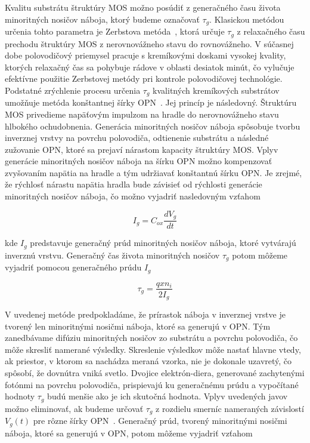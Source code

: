 Kvalitu substrátu štruktúry MOS možno posúdiť z generačného času
života minoritných nosičov náboja, ktorý budeme označovať
$\tau_g$. Klasickou metódou určenia tohto parametra je Zerbstova
metóda~\cite{3.2}, ktorá určuje $\tau_g$ z relaxačného času prechodu
štruktúry MOS z nerovnovážneho stavu do rovnovážneho. V súčasnej dobe
polovodičový priemysel pracuje s kremíkovými doskami vysokej kvality,
ktorých relaxačný čas sa pohybuje rádove v oblasti desiatok minút, čo
vylučuje efektívne použitie Zerbstovej metódy pri kontrole
polovodičovej technológie. Podstatné zrýchlenie procesu určenia
$\tau_g$ kvalitných kremíkových substrátov umožňuje metóda konštantnej
šírky OPN~\cite{3.1}. Jej princíp je následovný.  Štruktúru MOS
privedieme napäťovým impulzom na hradle do nerovnovážneho stavu
hlbokého ochudobnenia. Generácia minoritných nosičov náboja spôsobuje
tvorbu inverznej vrstvy na povrchu polovodiča, odtienenie substrátu a
následné zužovanie OPN, ktoré sa prejaví nárastom kapacity štruktúry
MOS\@. Vplyv generácie minoritných nosičov náboja na šírku OPN možno
kompenzovať zvyšovaním napätia na hradle a tým udržiavať konštantnú
šírku OPN\@. Je zrejmé, že rýchlosť nárastu napätia hradla bude závisieť
od rýchlosti generácie minoritných nosičov náboja, čo možno vyjadriť
nasledovným vzťahom~\cite{3.3}

\begin{equation}\label{eq:3.4}
  I_g = C_{ox} \frac{dV_g}{dt}
\end{equation}

kde $I_g$ predstavuje generačný prúd minoritných nosičov náboja, ktoré
vytvárajú inverznú vrstvu.  Generačný čas života minoritných nosičov
$\tau_g$ potom môžeme vyjadriť pomocou generačného prúdu $I_g$~\cite{3.3}

\begin{equation}\label{eq:3.5}
  \tau_g = \frac{qxn_i}{2I_g}
\end{equation}

V uvedenej metóde predpokladáme, že prírastok náboja v inverznej
vrstve je tvorený len minoritnými nosičmi náboja, ktoré sa generujú v
OPN\@. Tým zanedbávame difúziu minoritných nosičov zo substrátu a
povrchu polovodiča, čo môže skresliť namerané výsledky. Skreslenie
výsledkov môže nastať hlavne vtedy, ak priestor, v ktorom sa nachádza
meraná vzorka, nie je dokonale uzavretý, čo spôsobí, že dovnútra vniká
svetlo.  Dvojice elektrón-diera, generované zachytenými fotónmi na
povrchu polovodiča, prispievajú ku generačnému prúdu a vypočítané
hodnoty $\tau_g$ budú menšie ako je ich skutočná hodnota.  Vplyv
uvedených javov možno eliminovať, ak budeme určovať $\tau_g$ z
rozdielu smerníc nameraných závislostí $V_g(t)$ pre rôzne šírky
OPN~\cite{3.3, 3.10, 3.11, 3.12}. Generačný prúd, tvorený minoritnými
nosičmi náboja, ktoré sa generujú v OPN, potom môžeme vyjadriť vzťahom

